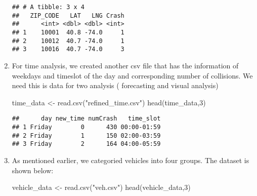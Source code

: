 \documentclass[
]{article}
\newenvironment{Shaded}{\begin{snugshade}}{\end{snugshade}}
\newcommand{\DecValTok}[1]{\textcolor[rgb]{0.00,0.00,0.81}{#1}}
\newcommand{\FunctionTok}[1]{\textcolor[rgb]{0.00,0.00,0.00}{#1}}
\newcommand{\NormalTok}[1]{#1}
\newcommand{\OtherTok}[1]{\textcolor[rgb]{0.56,0.35,0.01}{#1}}
\newcommand{\StringTok}[1]{\textcolor[rgb]{0.31,0.60,0.02}{#1}}
\begin{document}
\begin{enumerate}
\begin{verbatim}
## # A tibble: 3 x 4
##   ZIP_CODE   LAT   LNG Crash
##      <int> <dbl> <dbl> <int>
## 1    10001  40.8 -74.0     1
## 2    10012  40.7 -74.0     1
## 3    10016  40.7 -74.0     3
\end{verbatim}
\item
  For time analysis, we created another csv file that has the
  information of weekdays and timeslot of the day and corresponding
  number of collisions. We need this is data for two analysis (
  forecasting and visual analysis)

\begin{Shaded}
\begin{Highlighting}[]
\NormalTok{time\_data }\OtherTok{\textless{}{-}} \FunctionTok{read.csv}\NormalTok{(}\StringTok{"refined\_time.csv"}\NormalTok{) }
\FunctionTok{head}\NormalTok{(time\_data,}\DecValTok{3}\NormalTok{)}
\end{Highlighting}
\end{Shaded}

\begin{verbatim}
##      day new_time numCrash   time_slot
## 1 Friday        0      430 00:00-01:59
## 2 Friday        1      150 02:00-03:59
## 3 Friday        2      164 04:00-05:59
\end{verbatim}
\item
  As mentioned earlier, we categoried vehicles into four groups. The
  dataset is shown below:

\begin{Shaded}
\begin{Highlighting}[]
\NormalTok{vehicle\_data }\OtherTok{\textless{}{-}} \FunctionTok{read.csv}\NormalTok{(}\StringTok{"veh.csv"}\NormalTok{)}
\FunctionTok{head}\NormalTok{(vehicle\_data,}\DecValTok{3}\NormalTok{)}
\end{Highlighting}
\end{Shaded}


\end{enumerate}
\end{document}
